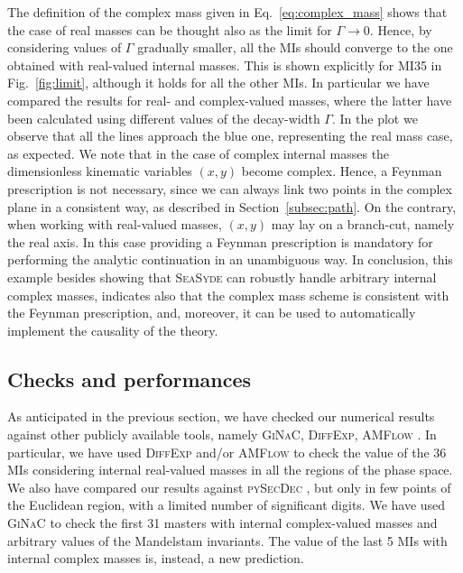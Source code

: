 The definition of the complex mass given in Eq.~\ref{eq:complex_mass} shows that the case of real masses can be thought also as the limit for $\Gamma\to0$. Hence, by considering values of $\Gamma$ gradually smaller, all the MIs should converge to the one obtained with real-valued internal masses. This is shown explicitly for MI35 in Fig.~\ref{fig:limit}, although it holds for all the other MIs. In particular we have compared the results for real- and complex-valued masses, where the latter have been calculated using different values of the decay-width $\Gamma$. In the plot we observe that all the lines approach the blue one, representing the real mass case, as expected.
We note that in the case of complex internal masses the dimensionless kinematic variables $(x,y)$ become complex. Hence, a Feynman prescription is not necessary, since we can always link two points in the complex plane in a consistent way, as described in Section~\ref{subsec:path}. On the contrary, when working with real-valued masses, $(x,y)$ may lay on a branch-cut, namely the real axis. In this case providing a Feynman prescription is mandatory for performing the analytic continuation in an unambiguous way. In conclusion, this example besides showing that \textsc{SeaSyde} can robustly handle arbitrary internal complex masses, indicates also that the complex mass scheme is consistent with the Feynman prescription, and, moreover, it can be used to automatically implement the causality of the theory.



\subsection{Checks and performances}

As anticipated in the previous section, we have checked our numerical results against other publicly available tools, namely \textsc{GiNaC}, \textsc{DiffExp}, \textsc{AMFlow} \cite{Liu:2022chg}. In particular, we have used \textsc{DiffExp} and/or \textsc{AMFlow} to check the value of the 36 MIs considering internal real-valued masses in all the regions of the phase space. We also have compared our results against \textsc{pySecDec} \cite{Borowka:2017idc}, but only in few points of the Euclidean region, with a limited number of significant digits.
We have used \textsc{GiNaC} to check the first 31 masters with internal complex-valued masses and arbitrary values of the Mandelstam invariants. The value of the last 5 MIs with internal complex masses is, instead, a new prediction. 

